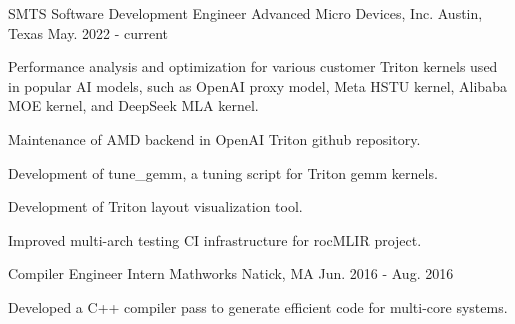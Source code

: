 

\begin{cventries}

  \cventry
    {SMTS Software Development Engineer} %
    {Advanced Micro Devices, Inc.} %
    {Austin, Texas} %
    {May. 2022 - current} %
    {
      \begin{cvitems} %
      \item {Performance analysis and optimization for various customer Triton kernels used in popular AI models,
          such as OpenAI proxy model, Meta HSTU kernel, Alibaba MOE kernel, and DeepSeek MLA kernel.}
      \item {Maintenance of AMD backend in OpenAI Triton github repository.}
      \item {Development of tune\_gemm, a tuning script for Triton gemm kernels.}
      \item {Development of Triton layout visualization tool.}
      \item {Improved multi-arch testing CI infrastructure for rocMLIR project.}
      \end{cvitems}
    }

  \cventry
    {Compiler Engineer Intern} %
    {Mathworks} %
    {Natick, MA} %
    {Jun. 2016 - Aug. 2016} %
    {
      \begin{cvitems} %
      \item Developed a C++ compiler pass to generate efficient code for multi-core systems.
      \end{cvitems}
    }

\end{cventries}
